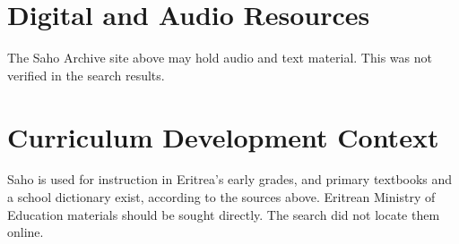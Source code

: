 \documentclass[12pt]{article}
\begin{document}
\section{Digital and Audio Resources}
The Saho Archive site above may hold audio and text material. This was not verified in the search results.

\section{Curriculum Development Context}
Saho is used for instruction in Eritrea's early grades, and primary textbooks and a school dictionary exist, according to the sources above. Eritrean Ministry of Education materials should be sought directly. The search did not locate them online.
\end{document}
